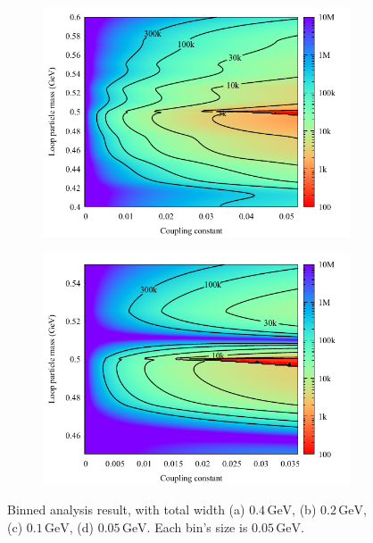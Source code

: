 \documentclass[10pt]{article}
\theoremstyle{definition}
\theoremstyle{remark}
\begin{document}
\begin{figure}[h]
\begin{subfigure}{0.3\textwidth}
			\caption{}
		\end{subfigure}
		\vfill
		\begin{subfigure}{0.3\textwidth}
			\centering
			\includegraphics[width=\textwidth]{binned_0.1GeV.pdf}
			\caption{}
		\end{subfigure}
		\begin{subfigure}{0.3\textwidth}
		\centering
		\includegraphics[width=\textwidth]{binned_0.05GeV.pdf}
		\caption{}
		\end{subfigure}
		\caption{Binned analysis result, with total width (a) $0.4\,\mathrm{GeV}$, (b) $0.2\,\mathrm{GeV}$, (c) $0.1\,\mathrm{GeV}$, (d) $0.05\,\mathrm{GeV}$. Each bin's size is $0.05\,\mathrm{GeV}$.}
		\label{fig:binned}
	\end{figure}
	
	
	
\end{document}
